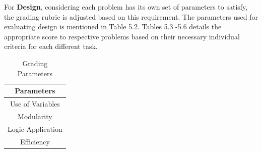 For \textbf{Design}, considering each problem has its own set of parameters to satisfy, the grading rubric is adjusted based on this requirement. The parameters used for evaluating design is mentioned in Table 5.2. Tables 5.3 -5.6 details the appropriate score to respective problems based on their necessary individual criteria for each different task.
        
        
\begin{table}[h!]
\centering
\begin{tabular}{|c|}
\hline
\textbf{Parameters} \\ \hline
Use of Variables \\ \hline
Modularity \\ \hline
Logic Application \\ \hline
Efficiency \\ \hline
\end{tabular}
\caption{Grading Parameters}
\label{tab:params}
\end{table}



